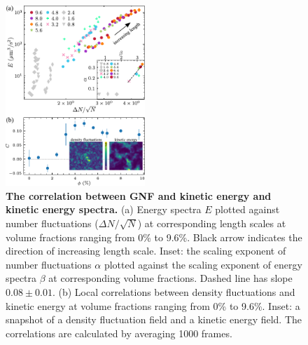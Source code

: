 \documentclass[twocolumn,aps,prl,amsmath,amssymb,longbibliography]{revtex4-2}
\begin{document}
\begin{figure}[!]
\begin{center}
\includegraphics[width=0.47\textwidth]{figures/GNF-energy-spectra-correlation/v4.pdf}
\caption[The correlation between GNF and kinetic energy and kinetic energy spectra.]
{
\textbf{The correlation between GNF and kinetic energy and kinetic energy spectra.}
(a) Energy spectra $E$ plotted against number fluctuations ($\Delta N/\sqrt N$) at corresponding length scales at volume fractions ranging from 0\% to 9.6\%. Black arrow indicates the direction of increasing length scale. Inset: the scaling exponent of number fluctuations $\alpha$ plotted against the scaling exponent of energy spectra $\beta$ at corresponding volume fractions. Dashed line has slope $0.08 \pm 0.01$.
(b) Local correlations between density fluctuations and kinetic energy at volume fractions ranging from 0\% to 9.6\%. Inset: a snapshot of a density fluctuation field and a kinetic energy field. The correlations are calculated by averaging 1000 frames.
}
\label{fig:GNF-energy-spectra-correlation}
\end{center}
\end{figure}
\end{document}
